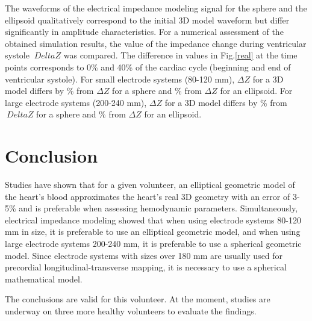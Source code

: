 \documentclass[conference]{IEEEtran}
\begin{document}
The waveforms of the electrical impedance modeling signal for the sphere and the
ellipsoid qualitatively correspond to the initial 3D model waveform but differ
significantly in amplitude characteristics. For a numerical assessment of the
obtained simulation results, the value of the impedance change during
ventricular systole $ \ Delta Z $ was compared. The difference in values ​​in
Fig.\ref{real} at the time points corresponds to 0\% and 40\% of the cardiac
cycle (beginning and end of ventricular systole). For small electrode systems
(80-120 mm), $\Delta Z$ for a 3D model differs by \% from $\Delta Z $ for a
sphere and \% from $\Delta Z$ for an ellipsoid. For large electrode systems
(200-240 mm), $\Delta Z$ for a 3D model differs by \% from $\ Delta Z$ for a
sphere and \% from $\Delta Z $ for an ellipsoid.%

\section{Conclusion}

Studies have shown that for a given volunteer, an elliptical geometric model of
the heart's blood approximates the heart's real 3D geometry with an error of
3-5\% and is preferable when assessing hemodynamic parameters. Simultaneously,
electrical impedance modeling showed that when using electrode systems 80-120 mm
in size, it is preferable to use an elliptical geometric model, and when using
large electrode systems 200-240 mm, it is preferable to use a spherical
geometric model. Since electrode systems with sizes over 180 mm are usually used
for precordial longitudinal-transverse mapping, it is necessary to use a
spherical mathematical model.

The conclusions are valid for this volunteer. At the moment, studies are
underway on three more healthy volunteers to evaluate the findings. 
\end{document}

